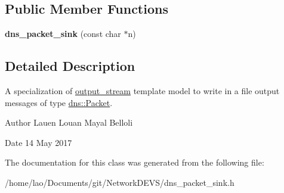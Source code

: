 \subsection*{Public Member Functions}
\begin{DoxyCompactItemize}
\item 
{\bfseries dns\+\_\+packet\+\_\+sink} (const char $\ast$n)\hypertarget{classdns__packet__sink_a2ead1895f1847c995f3bed2c10fe52e9}{}\label{classdns__packet__sink_a2ead1895f1847c995f3bed2c10fe52e9}

\end{DoxyCompactItemize}


\subsection{Detailed Description}
A specialization of \hyperlink{classoutput__stream}{output\+\_\+stream} template model to write in a file output messages of type \hyperlink{structdns_1_1Packet}{dns\+::\+Packet}. 

\begin{DoxyAuthor}{Author}
Lauen Louan Mayal Belloli 
\end{DoxyAuthor}
\begin{DoxyDate}{Date}
14 May 2017 
\end{DoxyDate}


The documentation for this class was generated from the following file\+:\begin{DoxyCompactItemize}
\item 
/home/lao/\+Documents/git/\+Network\+D\+E\+V\+S/dns\+\_\+packet\+\_\+sink.\+h\end{DoxyCompactItemize}
